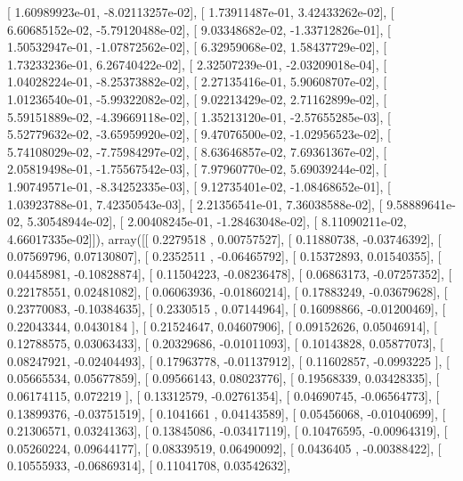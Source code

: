 \documentclass{article}
\begin{document}
       [  1.60989923e-01,  -8.02113257e-02],
       [  1.73911487e-01,   3.42433262e-02],
       [  6.60685152e-02,  -5.79120488e-02],
       [  9.03348682e-02,  -1.33712826e-01],
       [  1.50532947e-01,  -1.07872562e-02],
       [  6.32959068e-02,   1.58437729e-02],
       [  1.73233236e-01,   6.26740422e-02],
       [  2.32507239e-01,  -2.03209018e-04],
       [  1.04028224e-01,  -8.25373882e-02],
       [  2.27135416e-01,   5.90608707e-02],
       [  1.01236540e-01,  -5.99322082e-02],
       [  9.02213429e-02,   2.71162899e-02],
       [  5.59151889e-02,  -4.39669118e-02],
       [  1.35213120e-01,  -2.57655285e-03],
       [  5.52779632e-02,  -3.65959920e-02],
       [  9.47076500e-02,  -1.02956523e-02],
       [  5.74108029e-02,  -7.75984297e-02],
       [  8.63646857e-02,   7.69361367e-02],
       [  2.05819498e-01,  -1.75567542e-03],
       [  7.97960770e-02,   5.69039244e-02],
       [  1.90749571e-01,  -8.34252335e-03],
       [  9.12735401e-02,  -1.08468652e-01],
       [  1.03923788e-01,   7.42350543e-03],
       [  2.21356541e-01,   7.36038588e-02],
       [  9.58889641e-02,   5.30548944e-02],
       [  2.00408245e-01,  -1.28463048e-02],
       [  8.11090211e-02,   4.66017335e-02]]), array([[ 0.2279518 ,  0.00757527],
       [ 0.11880738, -0.03746392],
       [ 0.07569796,  0.07130807],
       [ 0.2352511 , -0.06465792],
       [ 0.15372893,  0.01540355],
       [ 0.04458981, -0.10828874],
       [ 0.11504223, -0.08236478],
       [ 0.06863173, -0.07257352],
       [ 0.22178551,  0.02481082],
       [ 0.06063936, -0.01860214],
       [ 0.17883249, -0.03679628],
       [ 0.23770083, -0.10384635],
       [ 0.2330515 ,  0.07144964],
       [ 0.16098866, -0.01200469],
       [ 0.22043344,  0.0430184 ],
       [ 0.21524647,  0.04607906],
       [ 0.09152626,  0.05046914],
       [ 0.12788575,  0.03063433],
       [ 0.20329686, -0.01011093],
       [ 0.10143828,  0.05877073],
       [ 0.08247921, -0.02404493],
       [ 0.17963778, -0.01137912],
       [ 0.11602857, -0.0993225 ],
       [ 0.05665534,  0.05677859],
       [ 0.09566143,  0.08023776],
       [ 0.19568339,  0.03428335],
       [ 0.06174115,  0.072219  ],
       [ 0.13312579, -0.02761354],
       [ 0.04690745, -0.06564773],
       [ 0.13899376, -0.03751519],
       [ 0.1041661 ,  0.04143589],
       [ 0.05456068, -0.01040699],
       [ 0.21306571,  0.03241363],
       [ 0.13845086, -0.03417119],
       [ 0.10476595, -0.00964319],
       [ 0.05260224,  0.09644177],
       [ 0.08339519,  0.06490092],
       [ 0.0436405 , -0.00388422],
       [ 0.10555933, -0.06869314],
       [ 0.11041708,  0.03542632],
\end{document}
